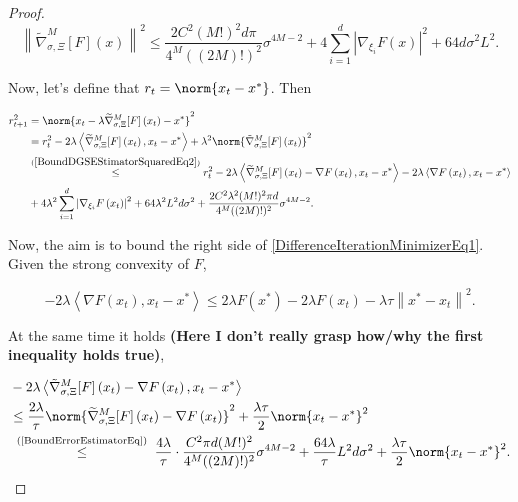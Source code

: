\begin{proof}
\begin{equation}\label{BoundDGSEStimatorSquaredEq2}
 \left\|\widetilde{\nabla}_{\sigma, \Xi}^{M}[F](x)\right\|^{2} \leq \frac{2 C^{2}(M !)^{2} d \pi}{4^{M}((2 M) !)^{2}} \sigma^{4 M-2} + 4 \sum_{i=1}^{d}\left|\nabla_{\xi_{i}} F(x)\right|^{2} +  64 d \sigma^2 L^2.
\end{equation}

Now, let's define that $r_t = \norm{x_t - x^*}$. Then

\begin{equation}\label{DifferenceIterationMinimizerEq1}
 \begin{aligned} 
 r_{t+1}^{2}
 & = \norm{x_{t}-\lambda \widetilde{\nabla}_{\sigma, \Xi}^{M} [F]\left(x_{t}\right)-x^{*}}^{2} \\
 & = r_{t}^{2}-2 \lambda\left\langle\widetilde{\nabla}_{\sigma, \Xi}^{M}[F]\left(x_{t}\right), x_{t}-x^{*}\right\rangle+\lambda^{2}\norm{\tilde{\nabla}_{\sigma, \Xi}^{M}[F]\left(x_{t}\right)}^{2} \\ 
 & \stackrel{(\ref{BoundDGSEStimatorSquaredEq2})}{\leq} r_{t}^{2}-2 \lambda\left\langle\widetilde{\nabla}_{\sigma, \Xi}^{M}[F]\left(x_{t}\right)-\nabla F\left(x_{t}\right), x_{t}-x^{*}\right\rangle-2 \lambda\left\langle\nabla F\left(x_{t}\right), x_{t}-x^{*}\right\rangle \\ 
 & +4 \lambda^{2} \sum_{i=1}^{d}\left|\nabla_{\xi_{i}} F\left(x_{t}\right)\right|^{2}+64 \lambda^{2} L^{2} d \sigma^{2}+\frac{2 C^{2} \lambda^{2}(M !)^{2} \pi d}{4^{M}((2 M) !)^{2}} \sigma^{4 M-2}. 
 \end{aligned} 
\end{equation}

Now, the aim is to bound the right side of \ref{DifferenceIterationMinimizerEq1}. Given the strong convexity of $F$, 

\begin{equation}
 -2 \lambda\left\langle\nabla F\left(x_{t}\right), x_{t}-x^{*}\right\rangle \leq 2 \lambda F\left(x^{*}\right)-2 \lambda F\left(x_{t}\right)-\lambda \tau\left\|x^{*}-x_{t}\right\|^{2} . 
\end{equation}

At the same time it holds \textbf{(Here I don't really grasp how/why the first inequality holds true)},

\begin{equation}
 \begin{aligned} 
 & -2 \lambda\left\langle\tilde{\nabla}_{\sigma, \Xi}^{M}[F]\left(x_{t}\right)-\nabla F\left(x_{t}\right), x_{t}-x^{*}\right\rangle \\ 
 & \leq \frac{2 \lambda}{\tau}\norm{\widetilde{\nabla}_{\sigma, \Xi}^{M}[F]\left(x_{t}\right)-\nabla F\left(x_{t}\right)}^{2}+\frac{\lambda \tau}{2}\norm{x_{t}-x^{*}}^{2} \\ 
 & \stackrel{\text { (\ref{BoundErrorEstimatorEq}) }}{\leq} \frac{4 \lambda}{\tau} \cdot \frac{C^{2} \pi d(M !)^{2}}{4^{M}((2 M) !)^{2}} \sigma^{4 M-2}+\frac{64 \lambda}{\tau} L^{2} d \sigma^{2}+\frac{\lambda \tau}{2}\norm{x_{t}-x^{*}}^{2}.
 \end{aligned} 
\end{equation}


\end{proof}
